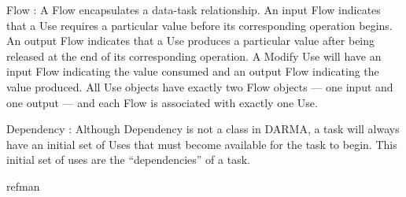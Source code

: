 \begin{compactdesc}
\item [Flow]: A Flow encapsulates a data-task relationship. 
An input Flow indicates that a Use requires a particular value before its corresponding operation begins.
An output Flow indicates that a Use produces a particular value after being released at the end of its corresponding operation.
A Modify Use will have an input Flow indicating the value consumed and an output Flow indicating the value produced.
All Use objects have exactly two Flow objects --- one input and one output ---
and each Flow is associated with exactly one Use.
\item [Dependency]: Although Dependency is not a class in DARMA, a task will always have an initial set of Uses that must become
available for the task to begin.
This initial set of uses are the ``dependencies'' of a task.
\end{compactdesc} 

{refman}
